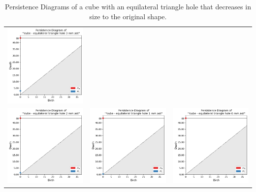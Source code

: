 \documentclass[ma]{uncgdissertationexp}
\theoremstyle{plain}
\theoremstyle{definition}
\theoremstyle{remark}
\begin{document}
\begin{table}[H]
\begin{center}
\begin{tabular}{ccc}
         \includegraphics[width=1.875in]{Final Run, (cube - equilateral triangle hole 3 mm) persdia.png} \\
         \includegraphics[width=1.875in]{Final Run, (cube - equilateral triangle hole 2 mm) persdia.png} & 
         \includegraphics[width=1.875in]{Final Run, (cube - equilateral triangle hole 1 mm) persdia.png} & 
         \includegraphics[width=1.875in]{Final Run, (cube - equilateral triangle hole 0 mm) persdia.png} \\
    \end{tabular}
    \end{center}
    \caption{Persistence Diagrams of a cube with an equilateral triangle hole that decreases in size to the original shape.}
    \label{fig:cube_triangle_hole_persdia_table}
\end{table}
\end{document}
